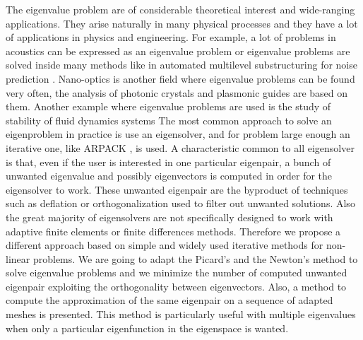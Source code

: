 \documentclass[preprint,12pt]{elsarticle}
\begin{document}
The eigenvalue problem are of considerable theoretical interest and wide-ranging applications.
They arise naturally in many physical processes 
and they have a lot of applications in physics and engineering. For example, a lot of problems in acoustics can be expressed as an eigenvalue problem or eigenvalue problems are solved inside many methods like in automated multilevel substructuring for noise prediction \cite{lalor_prediction_2007}.
Nano-optics is another field where eigenvalue problems can be found very often, the analysis of photonic crystals \cite{pcf_apost,JoMeWi:95} and plasmonic guides \cite{berini_plasmon-polariton_2000} are based on them. 
Another example where eigenvalue problems are used is the study of stability of fluid dynamics systems \cite{cliffe_adaptive_2010}
The most common approach to solve an eigenproblem in practice is use an eigensolver, and for problem large enough an iterative one, like ARPACK \cite{arpack}, is used.
A characteristic common to all eigensolver is that, even if the user is interested in one particular eigenpair, a bunch of unwanted eigenvalue and possibly eigenvectors is computed in order for the eigensolver to work. These unwanted eigenpair are the byproduct of techniques such as deflation or 
orthogonalization used to filter out unwanted solutions.
Also the great majority of eigensolvers are not specifically designed to work with adaptive finite elements or finite differences methods. Therefore we propose a different approach based on simple and widely used iterative methods for non-linear problems. We are going to adapt the Picard's and the Newton's method to solve eigenvalue problems and we minimize the number of computed unwanted eigenpair exploiting the orthogonality between eigenvectors. Also, a method to compute the approximation of the same eigenpair on a sequence of adapted meshes is presented. This method is particularly useful with multiple eigenvalues when only a particular eigenfunction in the eigenspace is wanted. 

\end{document}
